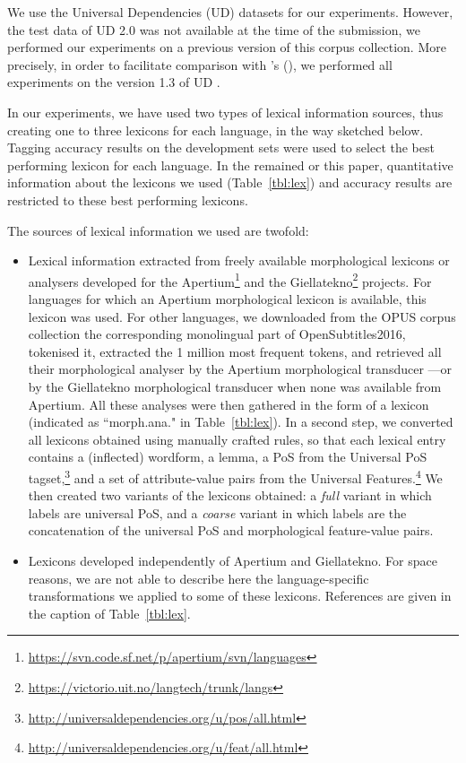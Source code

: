 \documentclass[11pt,letterpaper]{article}
\begin{document}
We use the Universal Dependencies (UD) datasets for our experiments. However, the test data of UD 2.0 was not available
at the time of the submission, we performed our experiments on a previous version of this corpus collection. More
precisely, in order to facilitate comparison with \citeauthor{plank16}'s (\citeyear{plank16}), we performed all
experiments on the version 1.3 of UD \cite{ud13}.

In our experiments, we have used two types of lexical information sources, thus creating one to three lexicons for each
language, in the way sketched below. Tagging accuracy results on the development sets were used to select the best
performing lexicon for each language. In the remained or this paper, quantitative information about the lexicons we used
(Table~\ref{tbl:lex}) and accuracy results are restricted to these best performing lexicons.

The sources of lexical information we used are twofold:
\begin{itemize}
\item Lexical information extracted from freely available morphological lexicons or analysers developed for the
  Apertium\footnote{\url{https://svn.code.sf.net/p/apertium/svn/languages}} and the
  Giellatekno\footnote{\url{https://victorio.uit.no/langtech/trunk/langs}} projects. For languages for which an Apertium
  morphological lexicon is available, this lexicon was used. For other languages, we downloaded from the OPUS corpus
  collection the corresponding monolingual part of OpenSubtitles2016, tokenised it, extracted the 1 million most
  frequent tokens, and retrieved all their morphological analyser by the Apertium morphological transducer ---or by the
  Giellatekno morphological transducer when none was available from Apertium. All these analyses were then gathered in
  the form of a lexicon (indicated as ``morph.ana." in Table~\ref{tbl:lex}). In a second step, we converted all lexicons
  obtained using manually crafted rules, so that each lexical entry contains a (inflected) wordform, a lemma, a PoS from
  the Universal PoS tagset,\footnote{\url{http://universaldependencies.org/u/pos/all.html}} and a set of attribute-value
  pairs from the Universal Features.\footnote{\url{http://universaldependencies.org/u/feat/all.html}} We then created
  two variants of the lexicons obtained: a {\em full} variant in which labels are universal PoS, and a {\em coarse}
  variant in which labels are the concatenation of the universal PoS and morphological feature-value pairs.
\item Lexicons developed independently of Apertium and Giellatekno. For space reasons, we are not able to describe here
  the language-specific transformations we applied to some of these lexicons. References are given in the caption of
  Table~\ref{tbl:lex}.
\end{itemize}
\end{document}
